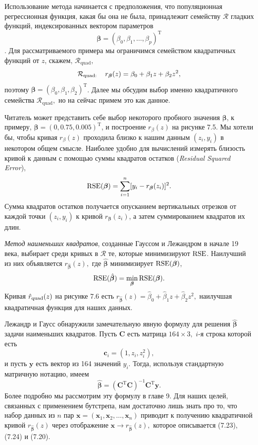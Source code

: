 Использование метода начинается с предположения, что популяционная регрессионная функция, какая бы она не была, принадлежит семейству $\mathcal R$ гладких функций, индексированных вектором параметров $$\bm \beta = (\beta_0,\beta_1,\ldots,\beta_p)^\mathrm{T}$$. Для рассматриваемого примера мы ограничимся семейством квадратичных функций от $z$, скажем, $\mathcal R_\text{quad},$
\begin{equation}
  \mathcal R_\text{quad: \quad} r_{\bm \beta}(z) = \beta_0 + \beta_1 z + \beta_2 z^2,
\end{equation}
поэтому $\bm \beta = (\beta_0,\beta_1,\beta_2)^\mathrm{T}$. Далее мы обсудим выбор именно квадратичного семейства $\mathcal R_\text{quad},$ но на сейчас примем это как данное.

Читатель может представить себе выбор некоторого пробного значения $\bm \beta$, к примеру, $\bm \beta = (0,0.75,0.005)^\mathrm{T}$, и построение $r_\beta(z)$ на рисунке 7.5. Мы хотели бы, чтобы кривая $r_\beta(z)$ проходила близко к нашим данным $(z_i, y_i)$ в некотором общем смысле. Наиболее удобно для вычислений измерять близость кривой к данным с помощью суммы квадратов остатков (\textit{Residual Squared Error}),
\begin{equation}
  \text{RSE}(\bm \beta) = \sum_{i = 1}^n [y_i - r_{\bm \beta} (z_i)]^2.
\end{equation}
Сумма квадратов остатков получается опусканием вертикальных отрезков от каждой точки $(z_i, y_i)$ к кривой $r_{\bm \beta} (z_i)$, а затем суммированием квадратов их длин.

\textit{Метод наименьших квадратов}, созданные Гауссом и Лежандром в начале 19 века, выбирает среди кривых в $\mathcal R$ те, которые минимизируют $\text{RSE}$. Наилучший из них объявляется $r_{\hat {\bm \beta}}(z),$ где $\hat {\bm\beta}$ минимизирует $\text{RSE}(\bm \beta)$,
\begin{equation}
  \text{RSE}(\hat{\bm \beta}) = \min_{\bm \beta}{\text{RSE}(\bm \beta)}.
\end{equation}
 Кривая $\hat{r}_{\text{quad}}(z)$ на рисунке 7.6 есть $r_{\hat{\bm \beta}}(z) = \hat \beta_0 + \hat \beta_1 z + \hat \beta_2 z^2,$ наилучшая квадратичная функция для наших данных.
 
 Лежандр и Гаусс обнаружили замечательную явную формулу для решения $\hat{\bm \beta}$ задачи наименьших квадратов. Пусть $\mathbf C$ есть матрица $164\times 3,$ $i$-я строка которой есть
 \begin{equation}
  \bm c_i = (1, z_i, z_i^2),
\end{equation}
и пусть $\mathbf y$ есть вектор из 164 значений $y_i.$ Тогда, используя стандартную матричную нотацию, имеем
\begin{equation}
  \hat{\bm \beta} = (\mathbf C^\mathrm{T} \mathbf{C})^{-1} \mathbf{C}^\mathrm{T} \mathbf y.
\end{equation}
Более  подробно мы рассмотрим эту формулу в главе 9. Для наших целей, связанных с применением бутстрепа, нам достаточно лишь знать про то, что набор данных из $n$ пар $\mathbf x = (\mathbf x_1, \mathbf x_2,\ldots, \mathbf x_n)$ приводит к получению квадратичной кривой $r_{\hat{\bm \beta}}(z)$ через отображение $\mathbf x \rightarrow r_{\hat{\bm \beta}}(z),$ которое описывается (7.23), (7.24) и (7.20).

